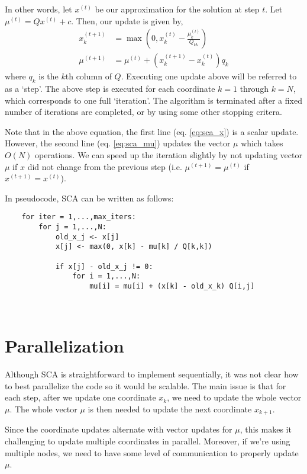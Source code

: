 \documentclass{article}
\begin{document}
In other words, let $x^{(t)}$ be our approximation for the solution at step $t$. Let $\mu^{(t)} = Q x^{(t)} + c$. Then, our update is given by,
\begin{align}
    x_k^{(t+1)} &= \max\left( 0, x_k^{(t)} - \frac{ \mu_k^{(t)}}{Q_{kk}} \right)\label{eq:sca_x}\\
    \mu^{(t+1)} &= \mu^{(t)} + ( x_k^{(t+1)} - x_k^{(t)} ) q_k\label{eq:sca_mu}
\end{align}
where $q_k$ is the $k$th column of $Q$. Executing one update above will be referred to as a `step'. The above step is executed for each coordinate $k = 1$ through $k = N$, which corresponds to one full `iteration'. The algorithm is terminated after a fixed number of iterations are completed, or by using some other stopping critera.

Note that in the above equation, the first line (eq. \ref{eq:sca_x}) is a scalar update. However, the second line (eq. \ref{eq:sca_mu}) updates the vector $\mu$ which takes $O(N)$ operations. We can speed up the iteration slightly by not updating vector $\mu$ if $x$ did not change from the previous step (i.e. $\mu^{(t+1)} = \mu^{(t)}$ if $x^{(t+1)} = x^{(t)}$).

In pseudocode, SCA can be written as follows:
\begin{verbatim}
    for iter = 1,...,max_iters:
        for j = 1,...,N:
            old_x_j <- x[j]
            x[j] <- max(0, x[k] - mu[k] / Q[k,k])
            
            if x[j] - old_x_j != 0:
                for i = 1,...,N:
                    mu[i] = mu[i] + (x[k] - old_x_k) Q[i,j]
            
            
\end{verbatim}


\section*{Parallelization}
Although SCA is straightforward to implement sequentially, it was not clear how to best parallelize the code so it would be scalable. The main issue is that for each step, after we update one coordinate $x_k$, we need to update the whole vector $\mu$. The whole vector $\mu$ is then needed to update the next coordinate $x_{k+1}$. 

Since the coordinate updates alternate with vector updates for $\mu$, this makes it challenging to update multiple coordinates in parallel. Moreover, if we're using multiple nodes, we need to have some level of communication to properly update $\mu$.
\end{document}
